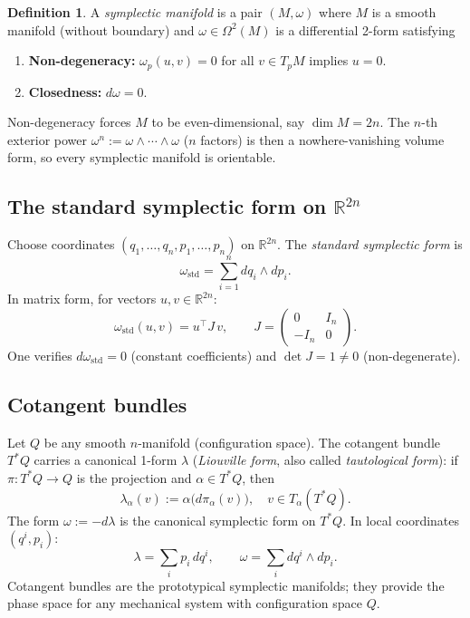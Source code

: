\documentclass[12pt,a4paper]{amsart}
\theoremstyle{definition}
\newtheorem{definition}[theorem]{Definition}
\begin{document}
\begin{definition}
A \emph{symplectic manifold} is a pair $(M, \omega)$ where $M$ is a smooth
manifold (without boundary) and $\omega \in \Omega^{2}(M)$ is a differential
2-form satisfying
\begin{enumerate}[label=(\roman*)]
  \item \textbf{Non-degeneracy:}  $\omega_p(u,v) = 0$ for all $v \in T_p M$
        implies $u = 0$.
  \item \textbf{Closedness:}  $d\omega = 0$.
\end{enumerate}
\end{definition}

Non-degeneracy forces $M$ to be even-dimensional, say $\dim M = 2n$.  The
$n$-th exterior power $\omega^n := \omega \wedge \cdots \wedge \omega$
($n$ factors) is then a nowhere-vanishing volume form, so every symplectic
manifold is orientable.

\subsection{The standard symplectic form on \texorpdfstring{$\mathbb{R}^{2n}$}{R2n}}

Choose coordinates $(q_1, \ldots, q_n, p_1, \ldots, p_n)$ on $\mathbb{R}^{2n}$.
The \emph{standard symplectic form} is
\begin{equation}\label{eq:omega_std}
  \omega_{\mathrm{std}} = \sum_{i=1}^{n} dq_i \wedge dp_i.
\end{equation}
In matrix form, for vectors $u, v \in \mathbb{R}^{2n}$:
\begin{equation}
  \omega_{\mathrm{std}}(u, v) = u^{\top} J\, v, \qquad
  J = \begin{pmatrix} 0 & I_n \\ -I_n & 0 \end{pmatrix}.
\end{equation}
One verifies $d\omega_{\mathrm{std}} = 0$ (constant coefficients) and
$\det J = 1 \neq 0$ (non-degenerate).

\subsection{Cotangent bundles}

Let $Q$ be any smooth $n$-manifold (configuration space).  The cotangent
bundle $T^*Q$ carries a canonical 1-form $\lambda$ (\emph{Liouville form},
also called \emph{tautological form}): if $\pi: T^*Q \to Q$ is the projection
and $\alpha \in T^*Q$, then
\[
  \lambda_\alpha(v) := \alpha\bigl(d\pi_\alpha(v)\bigr), \quad v \in T_\alpha(T^*Q).
\]
The form $\omega := -d\lambda$ is the canonical symplectic form on $T^*Q$.
In local coordinates $(q^i, p_i)$:
\[
  \lambda = \sum_i p_i \, dq^i, \qquad \omega = \sum_i dq^i \wedge dp_i.
\]
Cotangent bundles are the prototypical symplectic manifolds; they provide the
phase space for any mechanical system with configuration space $Q$.
\end{document}
